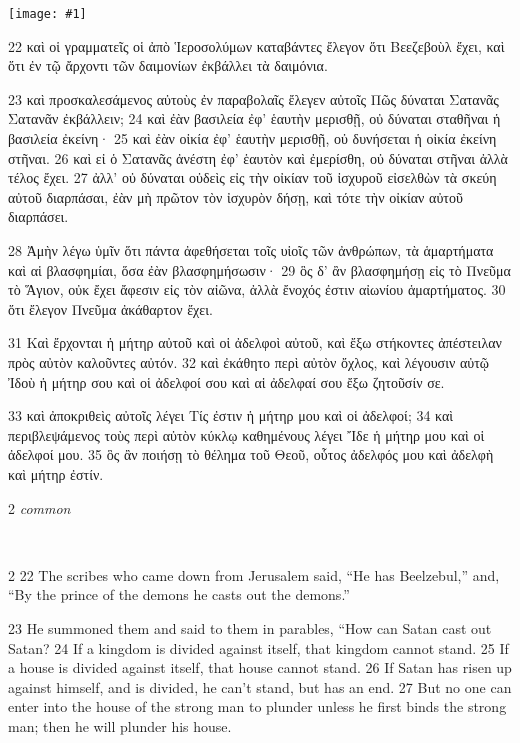 \documentclass[10pt,a5paper,twoside,twocolumn]{book}
\newcommand{\fig}[1]{\texttt{[image: \#1]}\label{fig:#1}}
\newcommand*\cleartoleftpage{%
  \ifodd\value{page}\hbox{}\clearpage\fi
}
\newcommand{\separator}{
  \vspace{-0.5\baselineskip}%
  \hspace{0.27\textwidth}%
  \noindent\makebox[\linewidth]{\resizebox{0.3333\linewidth}{1pt}{$\bullet$}}\bigskip%
  \vspace{-0.5\baselineskip}
}
\newcommand{\sceneseparator}{%
  \vspace{-0.7\baselineskip}%
  \hspace{-0.01\textwidth}\noindent\makebox[\linewidth]{\resizebox{0.15\linewidth}{1pt}{$\bullet$}}%
  \vspace{-0.2\baselineskip}
}
\newenvironment{facing}{\cleartoleftpage}{\clearpage\pagebreak}
\newenvironment{help}{\clearpage}{}
\newenvironment{helpsec}{\begin{minipage}[t]{\textwidth}\begin{multicols}{2}}{\end{multicols}\end{minipage}}
\newenvironment{vocab}{\begin{helpsec}}{\end{helpsec}}
\newenvironment{translation}{\separator\\\begin{helpsec}\footnotesize}{\end{helpsec}}
\begin{document}

\begin{facing}

\fig{03-22} %

22 καὶ οἱ γραμματεῖς οἱ ἀπὸ Ἱεροσολύμων καταβάντες ἔλεγον ὅτι Βεεζεβοὺλ ἔχει, καὶ ὅτι ἐν τῷ ἄρχοντι τῶν δαιμονίων ἐκβάλλει τὰ δαιμόνια. 

23 καὶ προσκαλεσάμενος αὐτοὺς ἐν παραβολαῖς ἔλεγεν αὐτοῖς Πῶς δύναται Σατανᾶς Σατανᾶν ἐκβάλλειν; 24 καὶ ἐὰν βασιλεία ἐφ’ ἑαυτὴν μερισθῇ, οὐ δύναται σταθῆναι ἡ βασιλεία ἐκείνη· 25 καὶ ἐὰν οἰκία ἐφ’ ἑαυτὴν μερισθῇ, οὐ δυνήσεται ἡ οἰκία ἐκείνη στῆναι. 26 καὶ εἰ ὁ Σατανᾶς ἀνέστη ἐφ’ ἑαυτὸν καὶ ἐμερίσθη, οὐ δύναται στῆναι ἀλλὰ τέλος ἔχει. 27 ἀλλ’ οὐ δύναται οὐδεὶς εἰς τὴν οἰκίαν τοῦ ἰσχυροῦ εἰσελθὼν τὰ σκεύη αὐτοῦ διαρπάσαι, ἐὰν μὴ πρῶτον τὸν ἰσχυρὸν δήσῃ, καὶ τότε τὴν οἰκίαν αὐτοῦ διαρπάσει. 

28 Ἀμὴν λέγω ὑμῖν ὅτι πάντα ἀφεθήσεται τοῖς υἱοῖς τῶν ἀνθρώπων, τὰ ἁμαρτήματα καὶ αἱ βλασφημίαι, ὅσα ἐὰν βλασφημήσωσιν· 29 ὃς δ’ ἂν βλασφημήσῃ εἰς τὸ Πνεῦμα τὸ Ἅγιον, οὐκ ἔχει ἄφεσιν εἰς τὸν αἰῶνα, ἀλλὰ ἔνοχός ἐστιν αἰωνίου ἁμαρτήματος. 30 ὅτι ἔλεγον Πνεῦμα ἀκάθαρτον ἔχει. 

\sceneseparator\vfill

31 Καὶ ἔρχονται ἡ μήτηρ αὐτοῦ καὶ οἱ ἀδελφοὶ αὐτοῦ, καὶ ἔξω στήκοντες ἀπέστειλαν πρὸς αὐτὸν καλοῦντες αὐτόν. 32 καὶ ἐκάθητο περὶ αὐτὸν ὄχλος, καὶ λέγουσιν αὐτῷ Ἰδοὺ ἡ μήτηρ σου καὶ οἱ ἀδελφοί σου καὶ αἱ ἀδελφαί σου ἔξω ζητοῦσίν σε. 

33 καὶ ἀποκριθεὶς αὐτοῖς λέγει Τίς ἐστιν ἡ μήτηρ μου καὶ οἱ ἀδελφοί; 34 καὶ περιβλεψάμενος τοὺς περὶ αὐτὸν κύκλῳ καθημένους λέγει Ἴδε ἡ μήτηρ μου καὶ οἱ ἀδελφοί μου. 35 ὃς ἂν ποιήσῃ τὸ θέλημα τοῦ Θεοῦ, οὗτος ἀδελφός μου καὶ ἀδελφὴ καὶ μήτηρ ἐστίν.


\begin{help}
\begin{vocab}
\emph{common}\\

\end{vocab}
\begin{translation}
22 The scribes who came down from Jerusalem said, ``He has Beelzebul,'' and, ``By the prince of the demons he casts out the demons.''

23 He summoned them and said to them in parables, ``How can Satan cast out Satan? 24  If a kingdom is divided against itself, that kingdom cannot stand. 25  If a house is divided against itself, that house cannot stand. 26  If Satan has risen up against himself, and is divided, he can't stand, but has an end. 27  But no one can enter into the house of the strong man to plunder unless he first binds the strong man; then he will plunder his house.


\end{translation}
\end{help}
\end{facing}
\end{document}
